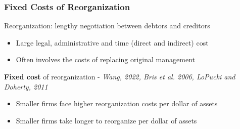 \documentclass[aspectratio=169,xcolor=table]{beamer}
\begin{document}
\begin{frame}[label = FCreorg] \frametitle{Fixed Costs of Reorganization \hfill \hyperlink{motivation2}{}}



Reorganization: lengthy negotiation between debtors and creditors 
\begin{itemize} \small 
    \item Large legal, administrative and time (direct and indirect)  cost
    \item Often involves the costs of replacing original management
\end{itemize} \normalsize \vspace{10mm}  

\textbf{Fixed cost} of reorganization - \footnotesize \textit{Wang, 2022,  Bris et al. 2006, LoPucki and Doherty, 2011} 
\begin{itemize} \small 
    \item Smaller firms face higher reorganization costs per dollar of assets
    \item Smaller firms take longer to reorganize per dollar of assets \hfill \hyperlink{daysin111}{}
\end{itemize} \normalsize \vspace{3mm}



\end{frame}
\end{document}
